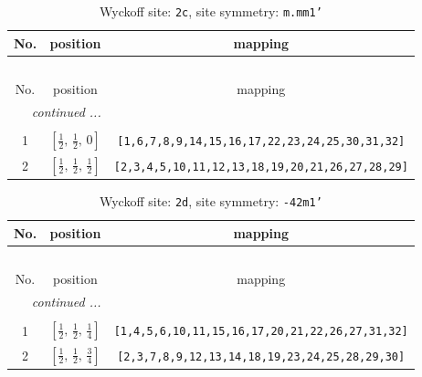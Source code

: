 \documentclass[fleqn,8pt]{jsarticle}
\begin{document}
\renewcommand{\arraystretch}{1.2}
\begin{longtable}{ccc}
\caption{Wyckoff site: {\tt 2c}, site symmetry: {\tt m.mm1'}}
 \\
 \hline \hline
No. & position & mapping \\ \hline \endfirsthead

\multicolumn{2}{l}{\tablename\ \thetable{}} \\
 \hline \hline
No. & position & mapping \\ \hline \endhead

 \hline \hline
\multicolumn{2}{r}{\footnotesize\it continued ...} \\ \endfoot

 \hline \hline
\multicolumn{2}{r}{} \\ \endlastfoot

1 & $\left[ \frac{1}{2},\, \frac{1}{2},\, 0 \right]$ & {\tt [1,6,7,8,9,14,15,16,17,22,23,24,25,30,31,32]} \\ \hline
2 & $\left[ \frac{1}{2},\, \frac{1}{2},\, \frac{1}{2} \right]$ & {\tt [2,3,4,5,10,11,12,13,18,19,20,21,26,27,28,29]} \\
\end{longtable}
\renewcommand{\arraystretch}{1.2}
\begin{longtable}{ccc}
\caption{Wyckoff site: {\tt 2d}, site symmetry: {\tt -42m1'}}
 \\
 \hline \hline
No. & position & mapping \\ \hline \endfirsthead

\multicolumn{2}{l}{\tablename\ \thetable{}} \\
 \hline \hline
No. & position & mapping \\ \hline \endhead

 \hline \hline
\multicolumn{2}{r}{\footnotesize\it continued ...} \\ \endfoot

 \hline \hline
\multicolumn{2}{r}{} \\ \endlastfoot

1 & $\left[ \frac{1}{2},\, \frac{1}{2},\, \frac{1}{4} \right]$ & {\tt [1,4,5,6,10,11,15,16,17,20,21,22,26,27,31,32]} \\ \hline
2 & $\left[ \frac{1}{2},\, \frac{1}{2},\, \frac{3}{4} \right]$ & {\tt [2,3,7,8,9,12,13,14,18,19,23,24,25,28,29,30]} \\
\end{longtable}
\renewcommand{\arraystretch}{1.2}
\end{document}
